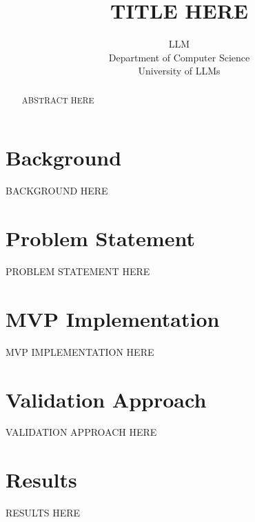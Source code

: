 \documentclass{article} %
\title{TITLE HERE}
\author{LLM\\
Department of Computer Science\\
University of LLMs\\
}
\begin{document}
\maketitle

\begin{abstract}
ABSTRACT HERE
\end{abstract}

\section{Background}
\label{sec:background}
BACKGROUND HERE

\section{Problem Statement}
\label{sec:problem}
PROBLEM STATEMENT HERE

\section{MVP Implementation}
\label{sec:mvp_implementation}
MVP IMPLEMENTATION HERE



\section{Validation Approach}
\label{sec:validation_approach}
VALIDATION APPROACH HERE

\section{Results}
\label{sec:results}
RESULTS HERE

\end{document}
